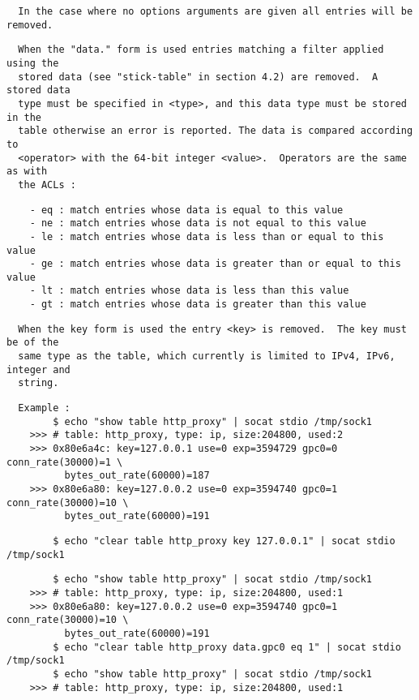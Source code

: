 \begin{verbatim}
  In the case where no options arguments are given all entries will be removed.
\end{verbatim}

\begin{verbatim}
  When the "data." form is used entries matching a filter applied using the
  stored data (see "stick-table" in section 4.2) are removed.  A stored data
  type must be specified in <type>, and this data type must be stored in the
  table otherwise an error is reported. The data is compared according to
  <operator> with the 64-bit integer <value>.  Operators are the same as with
  the ACLs :
\end{verbatim}

\begin{verbatim}
    - eq : match entries whose data is equal to this value
    - ne : match entries whose data is not equal to this value
    - le : match entries whose data is less than or equal to this value
    - ge : match entries whose data is greater than or equal to this value
    - lt : match entries whose data is less than this value
    - gt : match entries whose data is greater than this value
\end{verbatim}

\begin{verbatim}
  When the key form is used the entry <key> is removed.  The key must be of the
  same type as the table, which currently is limited to IPv4, IPv6, integer and
  string.
\end{verbatim}

\begin{verbatim}
  Example :
        $ echo "show table http_proxy" | socat stdio /tmp/sock1
    >>> # table: http_proxy, type: ip, size:204800, used:2
    >>> 0x80e6a4c: key=127.0.0.1 use=0 exp=3594729 gpc0=0 conn_rate(30000)=1 \
          bytes_out_rate(60000)=187
    >>> 0x80e6a80: key=127.0.0.2 use=0 exp=3594740 gpc0=1 conn_rate(30000)=10 \
          bytes_out_rate(60000)=191
\end{verbatim}

\begin{verbatim}
        $ echo "clear table http_proxy key 127.0.0.1" | socat stdio /tmp/sock1
\end{verbatim}

\begin{verbatim}
        $ echo "show table http_proxy" | socat stdio /tmp/sock1
    >>> # table: http_proxy, type: ip, size:204800, used:1
    >>> 0x80e6a80: key=127.0.0.2 use=0 exp=3594740 gpc0=1 conn_rate(30000)=10 \
          bytes_out_rate(60000)=191
        $ echo "clear table http_proxy data.gpc0 eq 1" | socat stdio /tmp/sock1
        $ echo "show table http_proxy" | socat stdio /tmp/sock1
    >>> # table: http_proxy, type: ip, size:204800, used:1
\end{verbatim}

